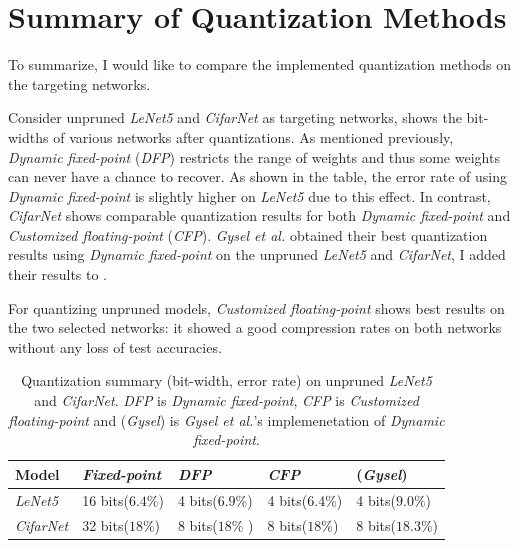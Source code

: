 \documentclass[a4paper,12pt]{report}
\begin{document}
\section{Summary of Quantization Methods}
To summarize, I would like
to compare the implemented quantization methods on the targeting networks.

Consider unpruned \textit{LeNet5} and \textit{CifarNet} as targeting networks,
shows the bit-widths of various networks after quantizations.
As mentioned previously, \textit{Dynamic fixed-point} (\textit{DFP}) restricts
the range of weights and thus some weights can never have a chance to recover.
As shown in the table, the error rate of using \textit{Dynamic fixed-point} is
slightly higher on \textit{LeNet5} due to this effect.
In contrast, \textit{CifarNet} shows comparable quantization results for both
\textit{Dynamic fixed-point} and \textit{Customized floating-point} (\textit{CFP}).
\textit{Gysel et al.} obtained their best quantization results using \textit{Dynamic fixed-point} on the unpruned
\textit{LeNet5} and \textit{CifarNet}, I added their results to .

For quantizing unpruned models, \textit{Customized floating-point}
shows best results on the two selected networks: it showed a good compression
rates on both networks without any loss of test accuracies.

\begin{table}[!h]
  \centering
  \begin{tabular}{lllll}
    \hline
    Model             & \textit{Fixed-point}  &\textit{DFP}   &\textit{CFP}   &(\textit{Gysel})\\
    \hline
    \hline
    \textit{LeNet5}   & 16 bits($6.4\%$)     &4 bits($6.9\%$)              &4 bits($6.4\%$)   & 4 bits($9.0\%$)\\
    \textit{CifarNet} & 32 bits($18\%$)      &8 bits($18\%$ )              &8 bits($18\%$)   & 8 bits($18.3\%$)\\
    \hline
    \hline
  \end{tabular}
  \caption{Quantization summary (bit-width, error rate) on unpruned
  \textit{LeNet5} and \textit{CifarNet}. \textit{DFP} is \textit{Dynamic fixed-point},
  \textit{CFP} is \textit{Customized floating-point} and (\textit{Gysel}) is
  \textit{Gysel et al.}'s implemenetation of \textit{Dynamic fixed-point}.}
  \label{tab:quantize_summary}
\end{table}
\end{document}
